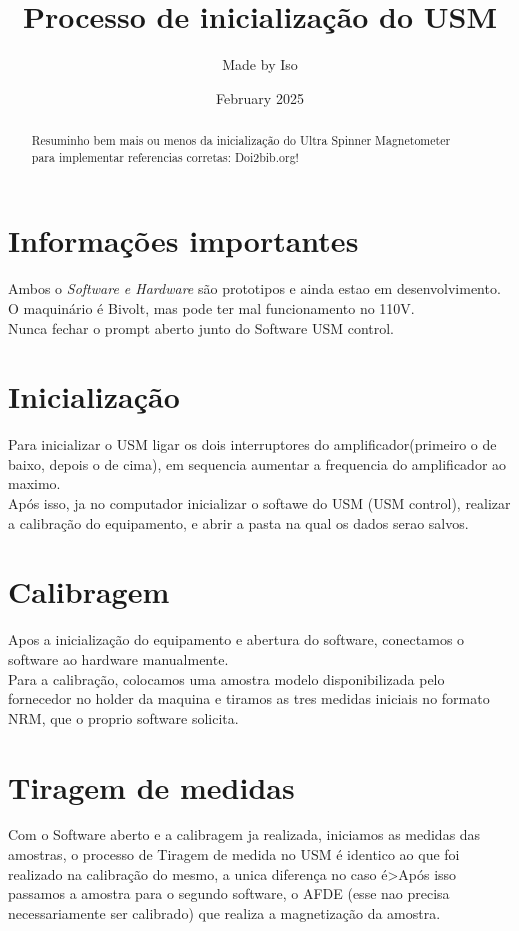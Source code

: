 \documentclass[twocolumn]{paper}
\title{Processo de inicialização do USM}
\author{Made by Iso }
\date{February 2025}
\begin{document}
\maketitle

\begin{abstract}
  Resuminho bem mais ou menos da inicialização do Ultra Spinner Magnetometer\\
  para implementar referencias corretas: Doi2bib.org!
\end{abstract}

\section{Informações importantes}
Ambos o \emph{Software e Hardware} são prototipos e ainda estao em desenvolvimento.\\
O maquinário é Bivolt, mas pode ter mal funcionamento no 110V.\\
Nunca fechar o prompt aberto junto do Software USM control.\\

\section{Inicialização}
Para inicializar o USM ligar os dois interruptores do amplificador(primeiro o de baixo, depois o de cima), em sequencia aumentar a frequencia do amplificador ao maximo.\\
Após isso, ja no computador inicializar o softawe do USM (USM control), realizar a calibração do equipamento, e abrir a pasta na qual os dados serao salvos.

\section{Calibragem}
Apos a inicialização do equipamento e abertura do software, conectamos o software ao hardware manualmente.\\
Para a calibração, colocamos uma amostra modelo disponibilizada pelo fornecedor no holder da maquina e tiramos as tres medidas iniciais no formato NRM, que o proprio software solicita.

\section{Tiragem de medidas}
Com o Software aberto e a calibragem ja realizada, iniciamos as medidas das amostras, o processo de Tiragem de medida no USM é identico ao que foi realizado na calibração do mesmo, a unica diferença no caso é>Após isso passamos a amostra para o segundo software, o AFDE (esse nao precisa necessariamente ser calibrado) que realiza a magnetização da amostra.
\end{document}
